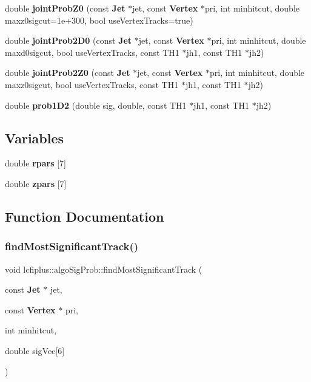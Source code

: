 \begin{DoxyCompactItemize}
\item 
double \textbf{ joint\+Prob\+Z0} (const \textbf{ Jet} $\ast$jet, const \textbf{ Vertex} $\ast$pri, int minhitcut, double maxz0sigcut=1e+300, bool use\+Vertex\+Tracks=true)
\item 
double \textbf{ joint\+Prob2\+D0} (const \textbf{ Jet} $\ast$jet, const \textbf{ Vertex} $\ast$pri, int minhitcut, double maxd0sigcut, bool use\+Vertex\+Tracks, const T\+H1 $\ast$jh1, const T\+H1 $\ast$jh2)
\item 
double \textbf{ joint\+Prob2\+Z0} (const \textbf{ Jet} $\ast$jet, const \textbf{ Vertex} $\ast$pri, int minhitcut, double maxz0sigcut, bool use\+Vertex\+Tracks, const T\+H1 $\ast$jh1, const T\+H1 $\ast$jh2)
\item 
double \textbf{ prob1\+D2} (double sig, double, const T\+H1 $\ast$jh1, const T\+H1 $\ast$jh2)
\end{DoxyCompactItemize}
\subsection*{Variables}
\begin{DoxyCompactItemize}
\item 
double \textbf{ rpars} [7]
\item 
double \textbf{ zpars} [7]
\end{DoxyCompactItemize}


\subsection{Function Documentation}
\mbox{\label{namespacelcfiplus_1_1algoSigProb_a59cef708bc2ffad16f788ad2400a3dd8}} 
\subsubsection{find\+Most\+Significant\+Track()}
{\footnotesize\ttfamily void lcfiplus\+::algo\+Sig\+Prob\+::find\+Most\+Significant\+Track (\begin{DoxyParamCaption}\item[{const \textbf{ Jet} $\ast$}]{jet,  }\item[{const \textbf{ Vertex} $\ast$}]{pri,  }\item[{int}]{minhitcut,  }\item[{double}]{sig\+Vec[6] }\end{DoxyParamCaption})}



